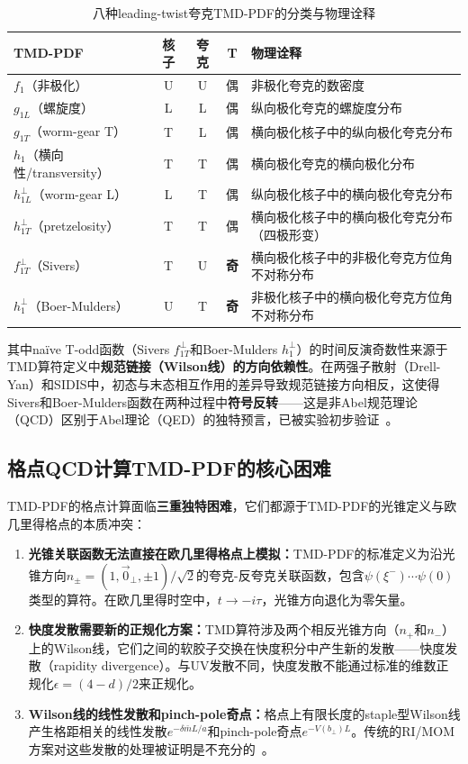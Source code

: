 \documentclass[12pt,a4paper]{ctexart}
\theoremstyle{definition}
\begin{document}
\begin{table}[H]
\centering
\caption{八种leading-twist夸克TMD-PDF的分类与物理诠释}
\label{tab:TMD_classification}
\begin{tabular}{lcccp{5cm}}
\toprule
TMD-PDF & 核子 & 夸克 & T & 物理诠释 \\
\midrule
$f_1$（非极化）          & U & U & 偶 & 非极化夸克的数密度 \\
$g_{1L}$（螺旋度）       & L & L & 偶 & 纵向极化夸克的螺旋度分布 \\
$g_{1T}$（worm-gear T）  & T & L & 偶 & 横向极化核子中的纵向极化夸克分布 \\
$h_1$（横向性/transversity）& T & T & 偶 & 横向极化夸克的横向极化分布 \\
$h_{1L}^\perp$（worm-gear L）& L & T & 偶 & 纵向极化核子中的横向极化夸克分布 \\
$h_{1T}^\perp$（pretzelosity）& T & T & 偶 & 横向极化核子中的横向极化夸克分布（四极形变） \\
$f_{1T}^\perp$（Sivers）  & T & U & \textbf{奇} & 横向极化核子中的非极化夸克方位角不对称分布 \\
$h_1^\perp$（Boer-Mulders）& U & T & \textbf{奇} & 非极化核子中的横向极化夸克方位角不对称分布 \\
\bottomrule
\end{tabular}
\end{table}

其中na\"ive T-odd函数（Sivers $f_{1T}^\perp$和Boer-Mulders $h_1^\perp$）的时间反演奇数性来源于TMD算符定义中\textbf{规范链接（Wilson线）的方向依赖性}。在两强子散射（Drell-Yan）和SIDIS中，初态与末态相互作用的差异导致规范链接方向相反，这使得Sivers和Boer-Mulders函数在两种过程中\textbf{符号反转}——这是非Abel规范理论（QCD）区别于Abel理论（QED）的独特预言，已被实验初步验证~\cite{Collins2011foundations}。

\subsection{格点QCD计算TMD-PDF的核心困难}

TMD-PDF的格点计算面临\textbf{三重独特困难}，它们都源于TMD-PDF的光锥定义与欧几里得格点的本质冲突：

\begin{enumerate}[leftmargin=*]
    \item \textbf{光锥关联函数无法直接在欧几里得格点上模拟：}TMD-PDF的标准定义为沿光锥方向$n_\pm = (1, \vec{0}_\perp, \pm 1)/\sqrt{2}$的夸克-反夸克关联函数，包含$\psi(\xi^-)\cdots\psi(0)$类型的算符。在欧几里得时空中，$t \to -i\tau$，光锥方向退化为零矢量。

    \item \textbf{快度发散需要新的正规化方案：}TMD算符涉及两个相反光锥方向（$n_+$和$n_-$）上的Wilson线，它们之间的软胶子交换在快度积分中产生新的发散——快度发散（rapidity divergence）。与UV发散不同，快度发散不能通过标准的维数正规化$\epsilon = (4-d)/2$来正规化。

    \item \textbf{Wilson线的线性发散和pinch-pole奇点：}格点上有限长度的staple型Wilson线产生格距相关的线性发散$e^{-\delta\bar{m} L/a}$和pinch-pole奇点$e^{-V(b_\perp)L}$。传统的RI/MOM方案对这些发散的处理被证明是不充分的~\cite{Zhang2022renormTMD}。
\end{enumerate}
\end{document}
